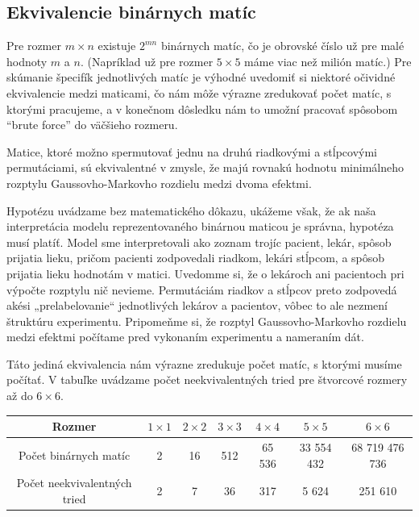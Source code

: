 \subsection{Ekvivalencie binárnych matíc}

Pre rozmer $m \times n$ existuje $2^{mn}$ binárnych matíc, čo je obrovské číslo už pre malé hodnoty $m$ a $n$.
(Napríklad už pre rozmer $5 \times 5$ máme viac než milión matíc.)
Pre skúmanie špecifík jednotlivých matíc je výhodné uvedomiť si niektoré očividné ekvivalencie medzi maticami, 
čo nám môže výrazne zredukovať počet matíc, s ktorými pracujeme,
 a v konečnom dôsledku nám to umožní pracovať spôsobom “brute force” do väčšieho rozmeru.

\begin{hypoteza}

Matice, ktoré možno spermutovať jednu na druhú riadkovými a stĺpcovými permutáciami, sú ekvivalentné v zmysle, 
že majú rovnakú hodnotu minimálneho rozptylu Gaussovho-Markovho rozdielu medzi dvoma efektmi.

\end{hypoteza}

Hypotézu uvádzame bez matematického dôkazu, ukážeme však, že ak naša interpretácia modelu reprezentovaného binárnou maticou je správna,
hypotéza musí platíť. Model sme interpretovali ako zoznam trojíc pacient, lekár, spôsob prijatia lieku, 
pričom pacienti zodpovedali riadkom, lekári stĺpcom, a spôsob prijatia lieku hodnotám v matici. 
Uvedomme si, že o lekároch ani pacientoch pri výpočte rozptylu nič nevieme. 
Permutáciám riadkov a stĺpcov preto zodpovedá akési „prelabelovanie“ jednotlivých lekárov a pacientov, 
vôbec to ale nezmení štruktúru experimentu. Pripomeňme si, že rozptyl Gaussovho-Markovho rozdielu medzi efektmi 
počítame pred vykonaním experimentu a nameraním dát.

Táto jediná ekvivalencia nám výrazne zredukuje počet matíc, s ktorými musíme počítať. 
V tabuľke uvádzame počet neekvivalentných tried pre štvorcové rozmery až do $6 \times 6$.

\begin{center}
\begin{tabular}{ |c|c|c|c|c|c|c| }
  \hline
  Rozmer & $1 \times 1$ & $2 \times 2$ & $3 \times 3$ & $4 \times 4$ & $5 \times 5$ & $6 \times 6$ \\ \hline
  Počet binárnych matíc & 2 & 16 & 512 & 65 536 & 33 554 432 & 68 719 476 736 \\ \hline
  Počet neekvivalentných tried & 2 & 7 & 36 & 317 & 5 624 & 251 610 \\ \hline
\end{tabular}
\end{center}


